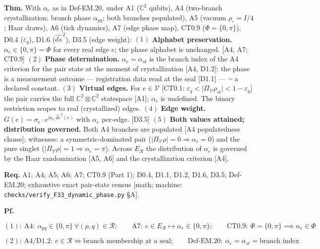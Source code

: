 \begin{theorem}\label{tag:EM-20}
\textbf{Thm.} With $\alpha_e$ as in Def-EM.20, under A1 ($\mathbb C^2$ qubits), A4 (two-branch crystallization; branch phase $\alpha_{pq}$; both branches populated), A5 (vacuum $\rho_\circ=I/4$; Haar draws), A6 (tick dynamics), A7 (edge phase map), CT0.9 ($\Phi=\{0,\pi\}$), D0.4 ($\varepsilon_q$), D1.6 ($\widehat{ds}^{\,2}$), D3.5 (edge weight): $(1)$ \textbf{Alphabet preservation.} $\alpha_e\in\{0,\pi\}=\Phi$ for every real edge $e$; the phase alphabet is unchanged. [A4, A7; CT0.9] $(2)$ \textbf{Phase determination.} $\alpha_e=\alpha_{st}$ is the branch index of the A4 criterion for the pair state at the moment of crystallization [A4, D1.2]: the phase is a measurement outcome — registration data read at the seal [D1.1] — $\neg$ a declared constant. $(3)$ \textbf{Virtual edges.} For $e\in\mathcal V$ [CT0.1: $\varepsilon_q<\bigl|\Pi_{\mathcal V}\rho_{st}\bigr|<1-\varepsilon_q$] the pair carries the full $\mathbb C^2\otimes\mathbb C^2$ statespace [A1]; $\alpha_e$ is undefined. The binary restriction scopes to real (crystallized) edges. $(4)$ \textbf{Edge weight.} $G(e)=\sigma_e\cdot e^{i\alpha_e\,\widehat{ds}^{\,2}(e)}$ with $\alpha_e$ per-edge. [D3.5] $(5)$ \textbf{Both values attained; distribution governed.} Both A4 branches are populated [A4 populatedness clause]; witnesses: a symmetric-dominated pair ($\bigl|\Pi_{\mathcal V}\rho\bigr|=0\Rightarrow\alpha_e=0$) and the pure singlet ($\bigl|\Pi_{\mathcal V}\rho\bigr|=1\Rightarrow\alpha_e=\pi$). Across $E_{\mathcal R}$ the distribution of $\alpha_e$ is governed by the Haar randomization [A5, A6] and the crystallization criterion [A4].

\textbf{Req.} A1; A4; A5; A6; A7; CT0.9 (Part 1); D0.4, D1.1, D1.2, D1.6, D3.5; Def-EM.20; exhaustive exact pair-state census [math; machine: \texttt{checks/\allowbreak{}verify\_\allowbreak{}F33\_\allowbreak{}dynamic\_\allowbreak{}phase.py} §A].

\textbf{Pf.}

\[
(1):\ \mathrm{A4}:\ \alpha_{pq}\in\{0,\pi\}\ \forall(p,q)\in\mathcal R;\qquad \mathrm{A7}:\ e\in E_{\mathcal R}\mapsto\alpha_e\in\{0,\pi\};\qquad \mathrm{CT0.9}:\ \Phi=\{0,\pi\}\implies\alpha_e\in\Phi
\]

\[
(2):\ \mathrm{A4}/\mathrm{D1.2}:\ e\in\mathcal R\iff\text{branch membership at a seal};\qquad \mathrm{Def\text{-}EM.20}:\ \alpha_e=\alpha_{st}=\text{branch index}
\]


\end{theorem}
